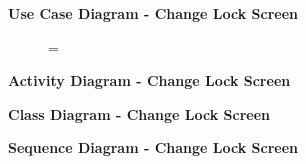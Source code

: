 \documentclass{article}
\begin{document}
		\begin{figure}[htbp]
			\textbf{Use Case Diagram - Change Lock Screen}
			\centering
			\begin{subfigure}{\textwidth}
				\resizebox{\textwidth}{!}{}
			\end{subfigure}
			\begin{subfigure}{\textwidth}
				=
			\end{subfigure}
		\end{figure}
		\clearpage

		\begin{figure}[htbp]
			\textbf{Activity Diagram - Change Lock Screen}
			\centering
			\begin{subfigure}{\textwidth}
				\centering
				\scalebox{0.9}{}
			\end{subfigure}
			\begin{subfigure}{\textwidth}
				
			\end{subfigure}
		\end{figure}
		\clearpage
		
		\begin{figure}[htbp]
			\textbf{Class Diagram - Change Lock Screen}
			\centering
			\begin{subfigure}{\textwidth}
				\resizebox{\textwidth}{!}{}
			\end{subfigure}
			\begin{subfigure}{\textwidth}
				
			\end{subfigure}
		\end{figure}
		\clearpage
		
		\begin{figure}[htbp]
			\textbf{Sequence Diagram - Change Lock Screen}
			\centering
			\begin{subfigure}{\textwidth}
				\centering
				\scalebox{0.7}{}
			\end{subfigure}
			\begin{subfigure}{\textwidth}
				
			\end{subfigure}
		\end{figure}

		\clearpage
		
		
\end{document}
